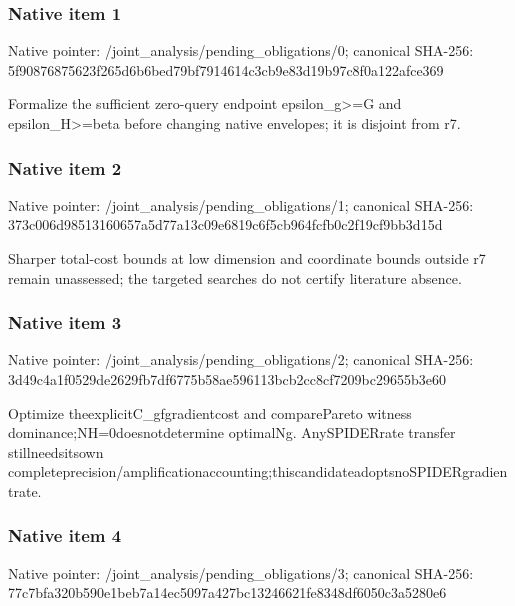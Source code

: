 \documentclass[10pt,a4paper]{article}
\begin{document}
\subsubsection{Native item 1}
Native pointer: /joint\_\allowbreak{}analysis/pending\_\allowbreak{}obligations/0; canonical SHA-256: 5f90876875623f265d6b6bed79bf7914614c3cb9e83d19b97c8f0a122afce369

\begingroup\raggedright\sloppy Formalize the sufficient zero-query endpoint epsilon\_\allowbreak{}g>=\allowbreak{}G and epsilon\_\allowbreak{}H>=\allowbreak{}beta before changing native envelopes;\allowbreak{} it is disjoint from r7.\par\endgroup

\subsubsection{Native item 2}
Native pointer: /joint\_\allowbreak{}analysis/pending\_\allowbreak{}obligations/1; canonical SHA-256: 373c006d98513160657a5d77a13c09e6819c6f5cb964fcfb0c2f19cf9bb3d15d

\begingroup\raggedright\sloppy Sharper total-cost bounds at low dimension and coordinate bounds outside r7 remain unassessed;\allowbreak{} the targeted searches do not certify literature absence.\par\endgroup

\subsubsection{Native item 3}
Native pointer: /joint\_\allowbreak{}analysis/pending\_\allowbreak{}obligations/2; canonical SHA-256: 3d49c4a1f0529de2629fb7df6775b58ae596113bcb2cc8cf7209bc29655b3e60

\begingroup\raggedright\sloppy Optimize theexplicitC\_\allowbreak{}gfgradientcost and comparePareto witness dominance;\allowbreak{}NH=\allowbreak{}0doesnotdetermine optimalNg. AnySPIDERrate transfer stillneedsitsown completeprecision/\allowbreak{}amplificationaccounting;\allowbreak{}thiscandidateadoptsnoSPIDERgradientrate.\par\endgroup

\subsubsection{Native item 4}
Native pointer: /joint\_\allowbreak{}analysis/pending\_\allowbreak{}obligations/3; canonical SHA-256: 77c7bfa320b590e1beb7a14ec5097a427bc13246621fe8348df6050c3a5280e6
\end{document}
